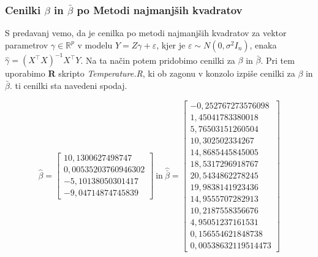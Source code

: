 \documentclass[a4paper, 10pt]{article}
\newcommand{\mth}[1]{\ensuremath{\mathbb{#1}}}
\newcommand{\R}{\mth{R}}
\begin{document}
	\subsubsection{Cenilki $\beta$ in $\bar{\beta}$ po Metodi najmanjših kvadratov}\label{subsubsect: 3ACenilki}
	
	S predavanj vemo, da je cenilka po metodi najmanjših kvadratov za vektor parametrov $\gamma\in\R^p$ v modelu $Y = Z\gamma + \varepsilon$, kjer je $\varepsilon \sim N(0, \sigma^2 I_n)$, enaka $\widehat{\gamma} = (X^{\top}X)^{-1}X^{\top}Y$. Na ta način potem pridobimo cenilki za $\beta$ in $\bar{\beta}$. Pri tem uporabimo \textbf{R} skripto \textit{Temperature.R}, ki ob zagonu v konzolo izpiše cenilki za $\beta$ in $\bar{\beta}$. ti cenilki sta navedeni spodaj.
	
	\[ 
	\widehat{\beta} = \begin{bmatrix}
			10{,}1300627498747 \\
			0{,}00535203760946302 \\                     
			-5{,}10138050301417 \\
			-9{,}04714874745839
		\end{bmatrix}~\text{in}~\widehat{\bar{\beta}} = \begin{bmatrix}
			-0{,}252767273576098 \\
			1{,}45041783380018 \\
			5{,}76503151260504 \\
			10{,}302502334267 \\
			14{,}8685445845005 \\
			18{,}5317296918767 \\
			20{,}5434862278245 \\
			19{,}9838141923436 \\
			14{,}9555707282913 \\
			10{,}2187558356676 \\
			4{,}95051237161531 \\
			0{,}156554621848738 \\
			0{,}00538632119514473
	\end{bmatrix}
	\]
	
\end{document}
